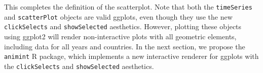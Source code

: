 \documentclass[journal]{vgtc}\usepackage[]{graphicx}\usepackage[]{color}
\begin{document}
This completes the definition of the scatterplot. Note that both the
\texttt{timeSeries} and \texttt{scatterPlot} objects are valid
ggplots, even though they use the new \texttt{clickSelects} and
\texttt{showSelected} aesthetics. However, plotting these objects
using ggplot2 will render non-interactive plots with all geometric
elements, including data for all years and countries. In the next
section, we propose the \texttt{animint} R package, which implements a new
interactive renderer for ggplots with the \texttt{clickSelects} and
\texttt{showSelected} aesthetics.

\end{document}
